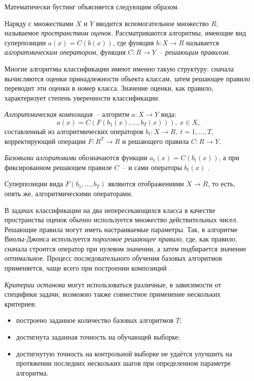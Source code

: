 Математически бустинг объясняется следующим образом.

Наряду с множествами $X$ и $Y$ вводится вспомогательное множество $R$, называемое \textit{пространством оценок}. Рассматриваются алгоритмы,
имеющие вид суперпозиции $a(x) = C(b(x))$, где функция $b: X \rightarrow R$ называется \textit{алгоритмическим оператором},
функция $C: R \rightarrow Y$~-- \textit{решающим правилом}.

Многие алгоритмы классификации имеют именно такую структуру: сначала вычисляются оценки принадлежности объекта классам, затем
решающее правило переводит эти оценки в номер класса. Значение оценки, как правило, характеризует степень уверенности
классификации.

\textit{Алгоритмическая композиция}~-- алгоритм $a: X \rightarrow Y$ \cite{viola_jones_2} вида:
\begin{equation}
a(x) = C(F(b_1(x), \dots, b_T(x))),\ x\in X,
\end{equation}
составленный из алгоритмических операторов $b_t: X \rightarrow R,\ t = \overline{1,\dots,T}$,
корректирующий операции $ F: R^T\rightarrow R $ и решающего правила $ C: R \rightarrow Y$.

\textit{Базовыми алгоритмами} обозначаются функции $a_t(x) = C(b_t(x)) $, а при фиксированном решающем правиле $C$~-- и сами
операторы $b_t(x)$ \cite{viola_jones_2}.

Суперпозиции вида $F(b_1, \dots, b_T)$ являются отображениями $X \rightarrow R$, то есть, опять же, алгоритмическими операторами.

В задачах классификации на два непересекающихся класса в качестве пространства оценок обычно используется множество действительных
чисел. Решающие правила могут иметь настраиваемые параметры. Так, в алгоритме Виолы-Джонса используется \textit{пороговое решающее
правило}, где, как правило, сначала строится оператор при нулевом значении, а затем подбирается значение оптимальное. Процесс
последовательного обучения базовых алгоритмов применяется, чаще всего при построении композиций \cite{viola_jones_2}.

\textit{Критерии останова} могут использоваться различные, в зависимости от специфики задачи, возможно также совместное применение
нескольких критериев:
\begin{itemize}
    \item построено заданное количество базовых алгоритмов $T$;
    \item достигнута заданная точность на обучающей выборке;
    \item достигнутую точность на контрольной выборке не удаётся улучшить на протяжении последних нескольких шагов при определенном
        параметре алгоритма.
\end{itemize}


